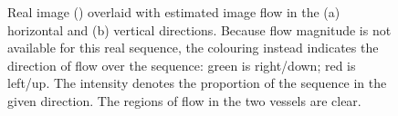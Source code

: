 \begin{figure}
\centering
{}
%
\caption{Real image () overlaid with estimated image flow in the (a) horizontal and (b) vertical directions. Because flow magnitude is not available for this real sequence, the colouring instead indicates the direction of flow over the sequence: green is right/down; red is left/up. The intensity denotes the proportion of the sequence in the given direction. The regions of flow in the two vessels are clear.}
\label{fig_flow_results}
\end{figure}
